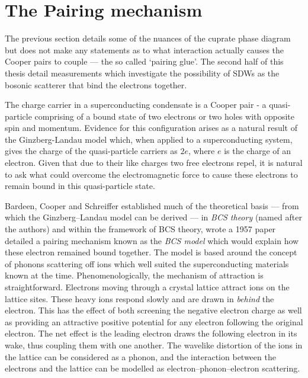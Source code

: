 

\section{The \highTc Pairing mechanism}
\label{Sec:Intro:Nesting}

The previous section details some of the nuances of the cuprate phase diagram but does not make any statements as to what interaction actually causes the Cooper pairs to couple --- the so called `pairing glue'. The second half of this thesis detail measurements which investigate the possibility of \acp{SDW} as the bosonic scatterer that bind the electrons together.

The charge carrier in a superconducting condensate is a Cooper pair - a quasi-particle comprising of a bound state of two electrons or two holes with opposite spin and momentum. Evidence for this configuration arises as a natural result of the Ginzberg-Landau model which, when applied to a superconducting system, gives the charge of the quasi-particle carriers as $2e$, where $e$ is the charge of an electron. Given that due to their like charges two free electrons repel, it is natural to ask what could overcome the electromagnetic force to cause these electrons to remain bound in this quasi-particle state.

Bardeen, Cooper and Schreiffer established much of the theoretical basis --- from which the Ginzberg--Landau model can be derived --- in \emph{\ac{BCS} theory} (named after the authors) and within the framework of \ac{BCS} theory, wrote a 1957 paper\cite{Bardeen1957} detailed a pairing mechanism known as the \emph{\ac{BCS} model} which would explain how these electron remained bound together. The model is based around the concept of phonons scattering off ions which well suited the superconducting materials known at the time. Phenomenologically, the mechanism of attraction is straightforward. Electrons moving through a crystal lattice attract ions on the lattice sites. These heavy ions respond slowly and are drawn in \emph{behind} the electron. This has the effect of both screening the negative electron charge as well as providing an attractive positive potential for any electron following the original electron. The net effect is the leading electron draws the following electron in its wake, thus coupling them with one another. The wavelike distortion of the ions in the lattice can be considered as a phonon, and the interaction between the electrons and the lattice can be modelled as electron--phonon--electron scattering.

